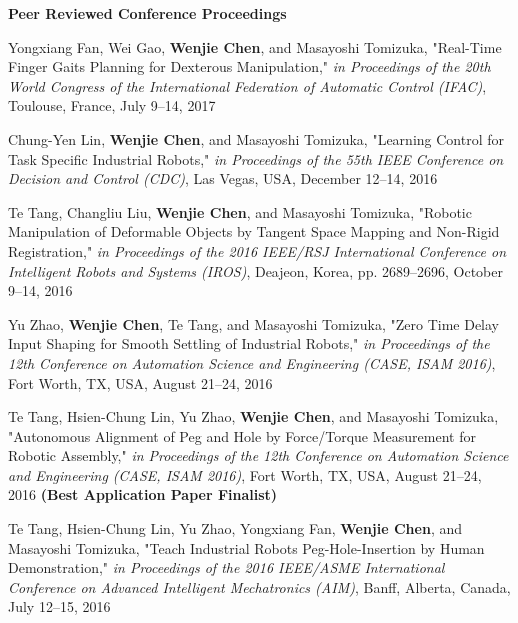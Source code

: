 \documentclass[UTF8,nofonts]{res}
\begin{document}
\begin{resume}
    \textbf{Peer Reviewed Conference Proceedings} %
    \begin{etaremune}[start=26]
    \item Yongxiang Fan, Wei Gao, \textbf{Wenjie Chen}, and Masayoshi Tomizuka, "Real-Time Finger Gaits Planning for Dexterous Manipulation," \emph{in Proceedings of the 20th World Congress of the International Federation of Automatic Control (IFAC)}, Toulouse, France, July 9--14, 2017
    \item Chung-Yen Lin, \textbf{Wenjie Chen}, and Masayoshi Tomizuka, "Learning Control for Task Specific Industrial Robots," \emph{in Proceedings of the 55th IEEE Conference on Decision and Control (CDC)}, Las Vegas, USA, December 12--14, 2016
	\item Te Tang, Changliu Liu, \textbf{Wenjie Chen}, and Masayoshi Tomizuka, "Robotic Manipulation of Deformable Objects by Tangent Space Mapping and Non-Rigid Registration," \emph{in Proceedings of the 2016 IEEE/RSJ International Conference on Intelligent Robots and Systems (IROS)}, Deajeon, Korea, pp. 2689--2696, October 9--14, 2016
	\item Yu Zhao, \textbf{Wenjie Chen}, Te Tang, and Masayoshi Tomizuka, "Zero Time Delay Input Shaping for Smooth Settling of Industrial Robots," \emph{in Proceedings of the 12th Conference on Automation Science and Engineering (CASE, ISAM 2016)}, Fort Worth, TX, USA, August 21--24, 2016
	\item Te Tang, Hsien-Chung Lin, Yu Zhao, \textbf{Wenjie Chen}, and Masayoshi Tomizuka, "Autonomous Alignment of Peg and Hole by Force/Torque Measurement for Robotic Assembly," \emph{in Proceedings of the 12th Conference on Automation Science and Engineering (CASE, ISAM 2016)}, Fort Worth, TX, USA, August 21--24, 2016 \textbf{(Best Application Paper Finalist)}
	\item Te Tang, Hsien-Chung Lin, Yu Zhao, Yongxiang Fan, \textbf{Wenjie Chen}, and Masayoshi Tomizuka, "Teach Industrial Robots Peg-Hole-Insertion by Human Demonstration," \emph{in Proceedings of the 2016 IEEE/ASME International Conference on Advanced Intelligent Mechatronics (AIM)}, Banff, Alberta, Canada, July 12--15, 2016

\end{etaremune}
\end{resume}
\end{document}
